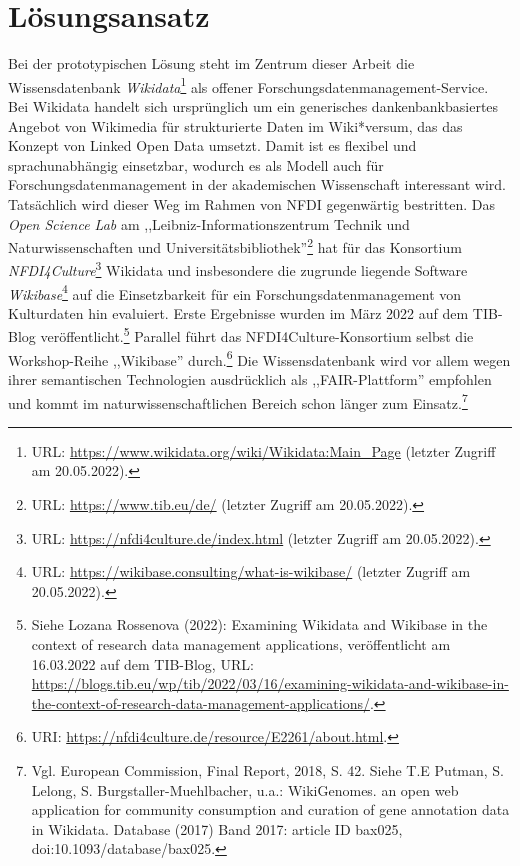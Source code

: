 \onehalfspacing

\section{Lösungsansatz}

Bei der prototypischen Lösung steht im Zentrum dieser Arbeit die Wissensdatenbank \textit{Wikidata}\footnote{URL: \url{https://www.wikidata.org/wiki/Wikidata:Main_Page} (letzter Zugriff am 20.05.2022).} als offener Forschungsdatenmanagement-Service. Bei Wikidata handelt sich ursprünglich um ein generisches dankenbankbasiertes Angebot von Wikimedia für strukturierte Daten im Wiki*versum, das das Konzept von Linked Open Data umsetzt. Damit ist es flexibel und sprachunabhängig einsetzbar, wodurch es als Modell auch für Forschungsdatenmanagement in der akademischen Wissenschaft interessant wird. Tatsächlich wird dieser Weg im Rahmen von NFDI gegenwärtig bestritten. Das \textit{Open Science Lab} am ,,Leibniz-Informationszentrum Technik und Naturwissenschaften und Universitätsbibliothek''\footnote{URL: \url{https://www.tib.eu/de/} (letzter Zugriff am 20.05.2022).} hat für das Konsortium \textit{NFDI4Culture}\footnote{URL: \url{https://nfdi4culture.de/index.html} (letzter Zugriff am 20.05.2022).} Wikidata und insbesondere die zugrunde liegende Software \textit{Wikibase}\footnote{URL: \url{https://wikibase.consulting/what-is-wikibase/} (letzter Zugriff am 20.05.2022).} auf die Einsetzbarkeit für ein Forschungsdatenmanagement von Kulturdaten hin evaluiert. Erste Ergebnisse wurden im März 2022 auf dem TIB-Blog veröffentlicht.\footnote{Siehe Lozana Rossenova (2022): Examining Wikidata and Wikibase in the context of research data management applications, veröffentlicht am 16.03.2022 auf dem TIB-Blog, URL: \url{https://blogs.tib.eu/wp/tib/2022/03/16/examining-wikidata-and-wikibase-in-the-context-of-research-data-management-applications/}.} Parallel führt das NFDI4Culture-Konsortium selbst die Workshop-Reihe ,,Wikibase'' durch.\footnote{URI: \url{https://nfdi4culture.de/resource/E2261/about.html}.} Die Wissensdatenbank wird vor allem wegen ihrer semantischen Technologien ausdrücklich als ,,FAIR-Plattform'' empfohlen und kommt im naturwissenschaftlichen Bereich schon länger zum Einsatz.\footnote{Vgl. European Commission, Final Report, 2018, S. 42. Siehe T.E Putman, S. Lelong, S. Burgstaller-Muehlbacher, u.a.: WikiGenomes. an open web application for community consumption and curation of gene annotation data in Wikidata. Database (2017) Band 2017: article ID bax025, doi:10.1093/database/bax025.} 

